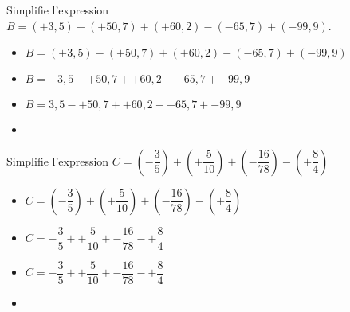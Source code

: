 \begin{exemple*1}
  Simplifie l'expression $B=(+3,5)-(+50,7)+(+60,2)-(-65,7)+(-99,9)$.
  \correction
  \begin{itemize}
    \item[] $B=(+3,5)-(+50,7)+(+60,2)-(-65,7)+(-99,9)$
    \item[] $B=+3,5-+50,7++60,2--65,7+-99,9$ 
    \item[] $B=3,5-+50,7++60,2--65,7+-99,9$
    \item[] 
  \end{itemize}
\end{exemple*1}

\begin{exemple*1}
  Simplifie l'expression $C=(-\dfrac35)+(+\dfrac5{10})+(-\dfrac{16}{78})-(+\dfrac84)$
  \correction
  \medskip
  \begin{itemize}
    \item[] $C=(-\dfrac35)+(+\dfrac5{10})+(-\dfrac{16}{78})-(+\dfrac84)$
    \item[] $C=-\dfrac35++\dfrac5{10}+-\dfrac{16}{78}-+\dfrac84$
    \item[] $C=-\dfrac35++\dfrac5{10}+-\dfrac{16}{78}-+\dfrac84$
    \item[] 
  \end{itemize}
\end{exemple*1}